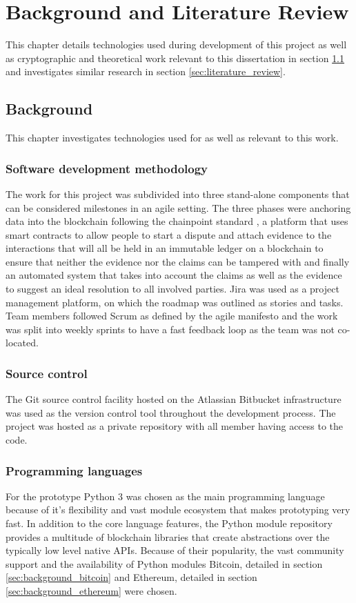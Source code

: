 \documentclass[12pt,msc,a4paper,oneside]{ucl_thesis}
\begin{document}
\chapter{Background and Literature Review}
\label{sec:bg_lit_review}
This chapter details technologies used during development of this project as well as cryptographic and theoretical work relevant to this dissertation in section \ref{sec:background} and investigates similar research in section \ref{sec:literature_review}.

\section{Background} \label{sec:background}
This chapter investigates technologies used for as well as relevant to this work.

\subsection{Software development methodology}
The work for this project was subdivided into three stand-alone components that can be considered milestones in an agile setting. The three phases were anchoring data into the blockchain following the chainpoint standard \cite{chainpoint:vaughan}, a platform that uses smart contracts to allow people to start a dispute and attach evidence to the interactions that will all be held in an immutable ledger on a blockchain to ensure that neither the evidence nor the claims can be tampered with and finally an automated system that takes into account the claims as well as the evidence to suggest an ideal resolution to all involved parties. %
Jira was used as a project management platform, on which the roadmap was outlined as stories and tasks. Team members followed Scrum as defined by the agile manifesto and the work was split into weekly sprints to have a fast feedback loop as the team was not co-located.

\subsection{Source control}
The Git source control facility hosted on the Atlassian Bitbucket infrastructure was used as the version control tool throughout the development process. The project was hosted as a private repository with all member having access to the code.

\subsection{Programming languages}
For the prototype Python 3 was chosen as the main programming language because of it's flexibility and vast module ecosystem that makes prototyping very fast. In addition to the core language features, the Python module repository provides a multitude of blockchain libraries that create abstractions over the typically low level native APIs. Because of their popularity, the vast community support and the availability of Python modules Bitcoin, detailed in section \ref{sec:background_bitcoin} and Ethereum, detailed in section \ref{sec:background_ethereum} were chosen.
\end{document}
